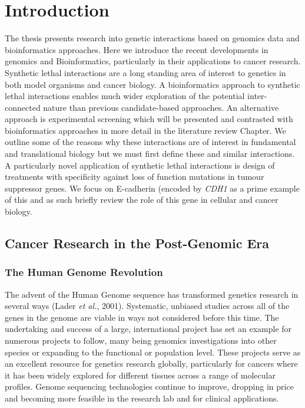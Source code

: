 \chapter{Introduction}
\label{chap:intro}



The thesis presents research into genetic interactions based on genomics data and bioinformatics approaches. Here we introduce the recent developments in genomics and Bioinformatics, particularly in their applications to cancer research. Synthetic lethal interactions are a long standing area of interest to genetics in both model organisms and cancer biology. A bioinformatics approach to synthetic lethal interactions enables much wider exploration of the potential inter-connected nature than previous candidate-based approaches. An alternative approach is experimental screening which will be presented and contrasted with bioinformatics approaches in more detail in the literature review Chapter. We outline some of the reasons why these interactions are of interest in fundamental and translational biology but we must first define these and similar interactions. A particularly novel application of synthetic lethal interactions is design of treatments with specificity against loss of function mutations in tumour suppressor genes. We focus on E-cadherin (encoded by \textit{CDH1} as a prime example of this and as such briefly review the role of this gene in cellular and cancer biology.   



\section{Cancer Research in the Post-Genomic Era}



\subsection{The Human Genome Revolution}
The advent of the Human Genome sequence has transformed genetics research in several ways (Lader \textit{et al.}, 2001). Systematic, unbiased studies across all of the genes in the genome are viable in ways not considered before this time. The undertaking and success of a large, international project has set an example for numerous projects to follow, many being genomics investigations into other species or expanding to the functional or population level. These projects serve as an excellent resource for genetics research globally, particularly for cancers where it has been widely explored for different tissues across a range of molecular profiles. Genome sequencing technologies continue to improve, dropping in price and becoming more feasible in the research lab and for clinical applications.


